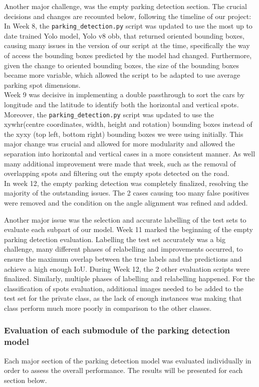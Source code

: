 Another major challenge, was the empty parking detection section. The crucial
decisions and changes are recounted below, following the timeline of our
project: \\
In Week 8, the \texttt{parking\_detection.py} script was updated to use the most
up to date trained Yolo model, Yolo v8 obb, that returned oriented bounding
boxes, causing many issues in the version of our script at the time,
specifically the way of access the bounding boxes predicted by the model had
changed. Furthermore, given the change to oriented bounding boxes, the size of
the bounding boxes became more variable, which allowed the script to be adapted
to use average parking spot dimensions.\\
Week 9 was decisive in implementing a double passthrough to sort the cars by
longitude and the latitude to identify both the horizontal and vertical spots.
Moreover, the \texttt{parking\_detection.py} script was updated to use the
xywhr(centre coordinates, width, height and rotation) bounding boxes instead of
the xyxy (top left, bottom right)  bounding boxes we were using initially. This
major change was crucial and allowed for more modularity and allowed the
separation into horizontal and vertical cases in a more consistent manner. As
well many additional improvement were made that week, such as the removal of
overlapping spots and filtering out the empty spots detected on the road.\\
In week 12, the empty parking detection was completely finalized, resolving the
majority of the outstanding issues. The 2 cases causing too many false positives
were removed and the condition on the angle alignment was refined and added.

Another major issue was the selection and accurate labelling of the test sets to
evaluate each subpart of our model. Week 11 marked the beginning of the empty
parking detection evaluation. Labelling the test set accurately was a big
challenge, many different phases of relabelling and improvements occurred, to
ensure the maximum overlap between the true labels and the predictions and
achieve a high enough IoU. During Week 12, the 2 other evaluation scripts were
finalized. Similarly, multiple phases of labelling and relabelling happened. For
the classification of spots evaluation, additional images needed to be added to
the test set for the private class, as the lack of enough instances was making
that class perform much more poorly in comparison to the other classes.

\subsubsection{Evaluation of each submodule of the parking detection model}
Each major section of the parking detection model was evaluated individually in order to assess the overall performance. The results will be presented for each section below.

